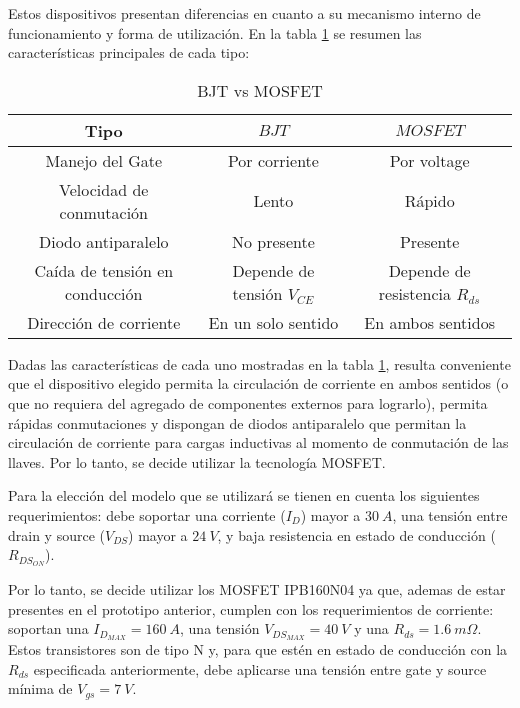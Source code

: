 Estos dispositivos presentan diferencias en cuanto a su mecanismo interno de funcionamiento y forma de utilización. En la tabla \ref{tab_MOSFETvsBJT} se resumen las características principales de cada tipo:

\begin{table}[H]
	\begin{center}
		\begin{tabular}{| c | c | c |}
			\hline
			Tipo & $BJT$ & $MOSFET$\\ \hline
			Manejo del Gate & Por corriente & Por voltage \\ \hline 
			Velocidad de conmutación & Lento & Rápido \\ \hline 
			Diodo antiparalelo & No presente & Presente \\ \hline 
			Caída de tensión en conducción & Depende de tensión  $V_{CE}$ & Depende de resistencia $R_{ds}$ \\ \hline 
			Dirección de corriente & En un solo sentido & En ambos sentidos \\ \hline 
		\end{tabular}
		\caption{BJT vs MOSFET}
		\label{tab_MOSFETvsBJT}
	\end{center}
\end{table}

Dadas las características de cada uno mostradas en la tabla \ref{tab_MOSFETvsBJT}, resulta conveniente que el dispositivo elegido permita la circulación de corriente en ambos sentidos (o que no requiera del agregado de componentes externos para lograrlo), permita rápidas conmutaciones y dispongan de diodos antiparalelo que permitan la circulación de corriente para cargas inductivas al momento de conmutación de las llaves. Por lo tanto, se decide utilizar la tecnología MOSFET.

Para la elección del modelo que se utilizará se tienen en cuenta los siguientes requerimientos: debe soportar una corriente ($I_{D}$) mayor a $30\:A$, una tensión entre drain y source ($V_{DS}$) mayor a $24\:V$, y baja resistencia en estado de conducción ($R_{DS_{ON}}$).

Por lo tanto, se decide utilizar los MOSFET IPB160N04 ya que, ademas de estar presentes en el prototipo anterior, cumplen con los requerimientos de corriente: soportan una $I_{D_{MAX}}=160\:A$, una tensión $V_{DS_{MAX}} = 40\:V$ y una $R_{ds} = 1.6 \:m \Omega$. Estos transistores son de tipo N y, para que estén en estado de conducción con la $R_{ds}$ especificada anteriormente, debe aplicarse una tensión entre gate y source mínima de $V_{gs}= 7\:V$.

